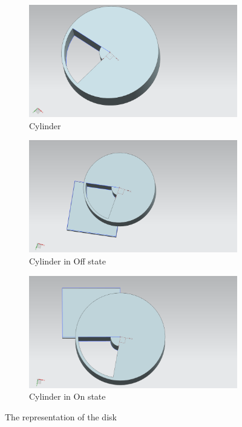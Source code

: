 \begin{figure}[ht]
     \centering
     \begin{subfigure}[b]{0.49\linewidth}
     \includegraphics[width=\linewidth]{img/cylinder.png}
     \caption{Cylinder}
     \label{fig:Cylinder1}
     \end{subfigure}
     \begin{subfigure}[b]{0.49\linewidth}
     \includegraphics[width=\linewidth]{img/cylinder2.png}
     \caption {Cylinder in Off state}
     \label{fig:Cylinder2}
     \end{subfigure}
     \label{fig:pwm}
     \begin{subfigure}[c]{0.49\linewidth}
     \includegraphics[width=\linewidth]{img/cylinder3.png}
     \caption {Cylinder in On state}
     \label{fig:Cylinder3}
     \end{subfigure}
     \caption{The representation of the disk}
     \label{fig:cylinder}
\end{figure}

